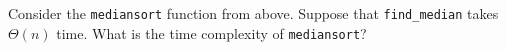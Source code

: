 \begin{prob}
    \inputminted[lastline=18]{python}{code.py}

    Consider the \texttt{mediansort} function from above. Suppose that \texttt{find_median}
    takes $\Theta(n)$ time. What is the time complexity of \texttt{mediansort}?

\end{prob}
